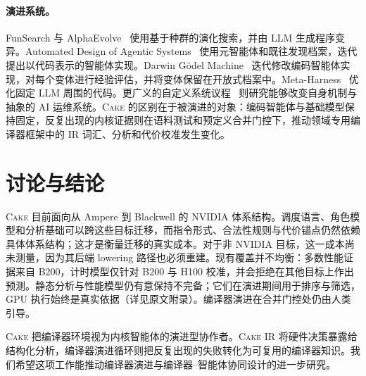 \documentclass[10pt]{article}
\newcommand{\cake}{\textsc{Cake}}
\newcommand{\cakeir}{\textsc{Cake IR}}
\begin{document}
\paragraph{演进系统。}
FunSearch 与 AlphaEvolve~\cite{romeraparedes2024funsearch,novikov2025alphaevolve} 使用基于种群的演化搜索，并由 LLM 生成程序变异。Automated Design of Agentic Systems~\cite{hu2025automated} 使用元智能体和既往发现档案，迭代提出以代码表示的智能体实现。Darwin G{\"o}del Machine~\cite{zhang2026darwingodelmachineopenended} 迭代修改编码智能体实现，对每个变体进行经验评估，并将变体保留在开放式档案中。Meta-Harness~\cite{lee2026metaharnessendtoendoptimizationmodel} 优化固定 LLM 周围的代码。更广义的自定义系统议程~\cite{anderson2025sds} 则研究能够改变自身机制与抽象的 AI 运维系统。\cake{} 的区别在于被演进的对象：编码智能体与基础模型保持固定，反复出现的内核证据则在语料测试和预定义合并门控下，推动领域专用编译器框架中的 IR 词汇、分析和代价校准发生变化。

\section{讨论与结论}
\label{sec:discussion}

\cake{} 目前面向从 Ampere 到 Blackwell 的 NVIDIA 体系结构。调度语言、角色模型和分析基础可以跨这些目标迁移，而指令形式、合法性规则与代价锚点仍然依赖具体体系结构；这才是衡量迁移的真实成本。对于非 NVIDIA 目标，这一成本尚未测量，因为其后端 lowering 路径也必须重建。现有覆盖并不均衡：多数性能证据来自 B200，计时模型仅针对 B200 与 H100 校准，并会拒绝在其他目标上作出预测。静态分析与性能模型仍有意保持不完备；它们在演进期间用于排序与筛选，GPU 执行始终是真实依据（详见原文附录）。编译器演进在合并门控处仍由人类引导。

\cake{} 把编译器环境视为内核智能体的演进型协作者。\cakeir{} 将硬件决策暴露给结构化分析，编译器演进循环则把反复出现的失败转化为可复用的编译器知识。我们希望这项工作能推动编译器演进与编译器--智能体协同设计的进一步研究。

{\small


}
\end{document}
